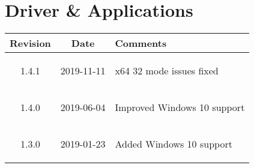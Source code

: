 \section{Driver \& Applications}
\begin{tabularx}{\textwidth}{|c|c|X|}
    \hline
    Revision & Date & Comments\\
    \hline\hline
    \hypertarget{drvrev}{1.4.1} & 2019-11-11 & x64 32 mode issues fixed\\
    \hline
    \hypertarget{drvrev}{1.4.0} & 2019-06-04 & Improved Windows 10 support\\
    \hline
    \hypertarget{drvrev}{1.3.0} & 2019-01-23 & Added Windows 10 support\\
    \hline
\end{tabularx}